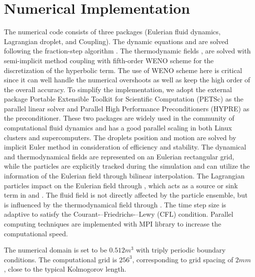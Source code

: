 \section{Numerical Implementation}
The numerical code consists of three packages (Eulerian fluid dynamics, Lagrangian droplet, and Coupling). The dynamic equations  and  are solved following the fraction-step algorithm \cite{Brown2001}. The thermodynamic fields ,  are solved with semi-implicit method coupling with fifth-order WENO scheme for the discretization of the hyperbolic term. The use of WENO scheme here is critical since it can well handle the numerical overshoots as well as keep the high order of the overall accuracy. To simplify the implementation, we adopt the external package Portable Extensible Toolkit for Scientific Computation (PETSc) \cite{petsc_cite} as the parallel linear solver and Parallel High Performance Preconditioners (HYPRE) \cite{hypre_cite} as the preconditioner. These two packages are widely used in the community of computational fluid dynamics and has a good parallel scaling in both Linux clusters and supercomputers. The droplets position  and motion  are solved by implicit Euler method in consideration of efficiency and stability. The dynamical and thermodynamical fields are represented on an Eulerian rectangular grid, while the particles are explicitly tracked during the simulation and can utilize the information of the Eulerian field through bilinear interpolation. The Lagrangian particles impact on the Eulerian field through , which acts as a source or sink term in  and . The fluid field is not directly affected by the particle ensemble, but is influenced by the thermodynamical field through . The time step size is adaptive to satisfy the Courant-–Friedrichs-–Lewy (CFL) condition. Parallel computing techniques are implemented with MPI library to increase the computational speed.

The numerical domain is set to be $0.512m^{3}$ with triply periodic boundary conditions. The computational grid is $256^{3}$, corresponding to grid spacing of $2mm$, close to the typical Kolmogorov length.

